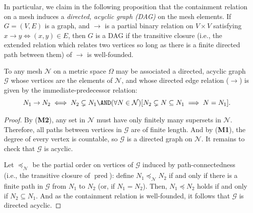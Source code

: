 In particular, we claim in the following proposition that the containment relation on a mesh induces a \textit{directed, acyclic graph (DAG)} on the mesh elements. If $G = (V, E)$ is a graph, and $\to$ is a partial binary relation on $V \times V$ satisfying $x \to y \iff (x, y) \in E$, then $G$ is a DAG if the transitive closure (i.e., the extended relation which relates two vertices so long as there is a finite directed path between them) of $\to$ is well-founded. 

\begin{proposition}
    \label{prop:DAG_characterization_of_mesh}
    To any mesh $\mathcal{N}$ on a metric space $\Omega$ may be associated a directed, acyclic graph $\mathcal{G}$ whose vertices are the elements of $\mathcal{N}$, and whose directed edge relation ($\rightarrow$) is given by the immediate-predecessor relation: 
    \[
        N_1 \rightarrow N_2 \iff N_2 \subsetneq N_1 \AND (\forall N \in \mathcal{N}) [N_2 \subsetneq N \subseteq N_1 \implies N = N_1].
    \]
\end{proposition}
\begin{proof}
    By (\textbf{M2}), any set in $\mathcal{N}$ must have only finitely many supersets in $\mathcal{N}$. Therefore, all paths between vertices in $\mathcal{G}$ are of finite length. And by (\textbf{M1}), the degree of every vertex is countable, so $\mathcal{G}$ is a directed graph on $\mathcal{N}$. It remains to check that $\mathcal{G}$ is acyclic. 
    
    Let $\preceq_{\mathcal{N}}$ be the partial order on vertices of $\mathcal{G}$ induced by path-connectedness (i.e., the transitive closure of $\operatorname{pred}$): define $N_1 \preceq_{\mathcal{N}} N_2$ if and only if there is a finite path in $\mathcal{G}$ from $N_1$ to $N_2$ (or, if $N_1 = N_2$). Then, $N_1 \preceq N_2$ holds if and only if $N_2 \subseteq N_1$. And as the containment relation is well-founded, it follows that $\mathcal{G}$ is directed acyclic. 
\end{proof}

